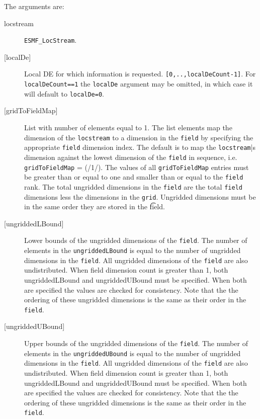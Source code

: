    The arguments are:
   \begin{description}
   \item [locstream]
         {\tt ESMF\_LocStream}.
   \item [{[localDe]}]
         Local DE for which information is requested. {\tt [0,..,localDeCount-1]}.
         For {\tt localDeCount==1} the {\tt localDe} argument may be omitted,
         in which case it will default to {\tt localDe=0}.
   \item [{[gridToFieldMap]}]
         List with number of elements equal to 1.
         The list elements map the dimension
         of the {\tt locstream} to a dimension in the {\tt field} by
         specifying the appropriate {\tt field} dimension index. The default is to
         map the {\tt locstream}|s dimension against the lowest dimension of
         the {\tt field} in sequence, i.e. {\tt gridToFieldMap} = (/1/).
         The values of all {\tt gridToFieldMap} entries must be greater than or equal
         to one and smaller than or equal to the {\tt field} rank.
         The total ungridded dimensions in the {\tt field}
         are the total {\tt field} dimensions less
         the dimensions in
         the {\tt grid}.  Ungridded dimensions must be in the same order they are
         stored in the {\t field}.  
   \item [{[ungriddedLBound]}]
         Lower bounds of the ungridded dimensions of the {\tt field}.
         The number of elements in the {\tt ungriddedLBound} is equal to the number of ungridded
         dimensions in the {\tt field}.  All ungridded dimensions of the
         {\tt field} are also undistributed. When field dimension count is
         greater than 1, both ungriddedLBound and ungriddedUBound
         must be specified. When both are specified the values are checked
         for consistency.  Note that the the ordering of
         these ungridded dimensions is the same as their order in the {\tt field}.
   \item [{[ungriddedUBound]}]
         Upper bounds of the ungridded dimensions of the {\tt field}.
         The number of elements in the {\tt ungriddedUBound} is equal to the number of ungridded
         dimensions in the {\tt field}.  All ungridded dimensions of the
         {\tt field} are also undistributed. When field dimension count is
         greater than 1, both ungriddedLBound and ungriddedUBound
         must be specified. When both are specified the values are checked
         for consistency.  Note that the the ordering of
         these ungridded dimensions is the same as their order in the {\tt field}.

\end{description}
